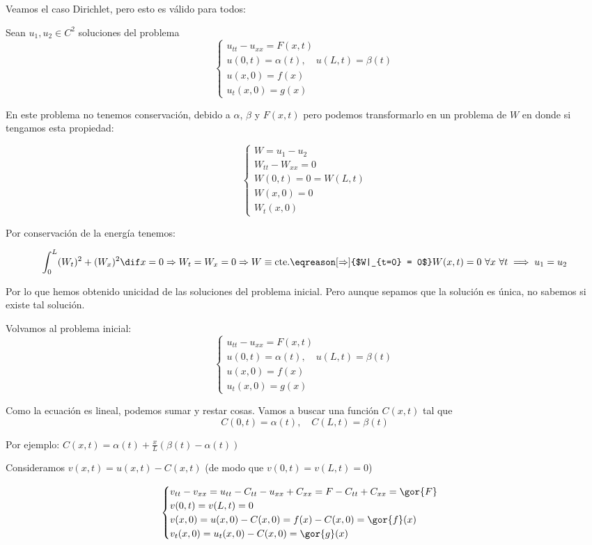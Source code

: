 			Veamos el caso Dirichlet, pero esto es válido para todos:

			Sean $u_1,u_2 \in C^2$ soluciones del problema
			\[ \begin{cases}
				u_{tt} - u_{xx} = F(x,t)\\
				u(0,t) = \alpha(t), \quad u(L,t) = \beta(t) \\
				u(x,0) = f(x) \\
				u_t(x,0) = g(x)
			\end{cases}\]

			En este problema no tenemos conservación, debido a $\alpha$, $\beta$ y $F(x,t)$ pero podemos transformarlo en un problema de $W$ en donde si tengamos esta propiedad:

			\[\begin{cases}
				W = u_1 - u_2 \\
				W_{tt} - W_{xx} = 0 \\
				W(0,t) = 0 = W(L,t) \\
				W(x,0) = 0 \\
				W_t(x,0)
			\end{cases}\]

			Por conservación de la energía tenemos:

			\[ \int_0^L (W_t)^2 + (W_x)^2 \dif x = 0 \Rightarrow W_t = W_x = 0 \Rightarrow W \equiv \text{cte.} \eqreason[\Rightarrow]{$W|_{t=0} = 0$} W(x,t) = 0 \ \forall x\ \forall t \implies u_1 = u_2 \]

			Por lo que hemos obtenido unicidad de las soluciones del problema inicial. Pero aunque sepamos que la solución es única, no sabemos si existe tal solución.

			Volvamos al problema inicial:
			\[ \begin{cases}
				u_{tt} - u_{xx} = F(x,t)\\
				u(0,t) = \alpha(t), \quad u(L,t) = \beta(t) \\
				u(x,0) = f(x) \\
				u_t(x,0) = g(x)
			\end{cases}\]

			Como la ecuación es lineal, podemos sumar y restar cosas. Vamos a buscar una función $C(x,t)$ tal que
			\[ C(0,t) = \alpha(t), \quad C(L,t) = \beta(t) \]

			Por ejemplo: $C(x,t) = \alpha(t) + \frac{x}{L} (\beta(t)-\alpha(t))$

			Consideramos $v(x,t) = u(x,t) - C(x,t)$ (de modo que $v(0,t) = v(L,t) = 0$)

			\[\begin{cases}
				v_{tt} - v_{xx} = u_{tt} - C_{tt} - u_{xx} + C_{xx} = F - C_{tt} + C_{xx} = \gor{F} \\
				v(0,t) = v(L,t) = 0 \\
				v(x,0) = u(x,0) - C(x,0) = f(x) - C(x,0) = \gor{f}(x) \\
				v_t (x,0) = u_t(x,0) - C(x,0) = \gor{g}(x)
			\end{cases}
			\]

